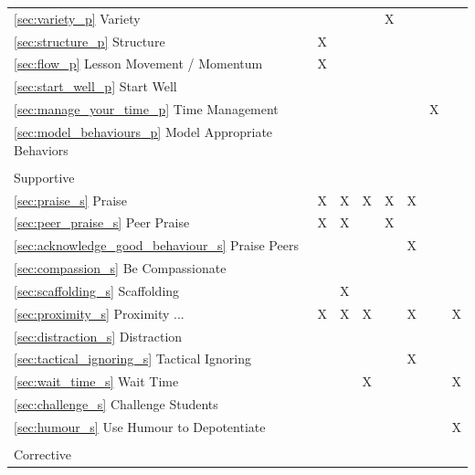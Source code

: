 \documentclass[12pt]{report}
\begin{document}
\begin{longtable}{l|c|c|c|c|c|c|c|}
\hspace{6pt}\ref{sec:variety_p} Variety                        & & & &X& & & \\
\hspace{6pt}\ref{sec:structure_p} Structure                      &X& & & & & & \\
\ref{sec:flow_p} Lesson Movement / Momentum                                       &X& & & & & & \\
\hspace{6pt}\ref{sec:start_well_p} Start Well                     & & & & & & & \\
\ref{sec:manage_your_time_p} Time Management                           & & & & & &X& \\
\ref{sec:model_behaviours_p} Model Appropriate Behaviors                          & & & & & & & \\
\hline
& & & & & & & \\
Supportive & & & & & & & \\ \hline
\ref{sec:praise_s} Praise                                     &X&X&X&X&X& & \\
\hspace{6pt}\ref{sec:peer_praise_s} Peer Praise                    &X&X& &X& & & \\
\hspace{6pt}\ref{sec:acknowledge_good_behaviour_s} Praise Peers     & & & & &X& & \\
\ref{sec:compassion_s} Be Compassionate                                 & & & & & & & \\
\ref{sec:scaffolding_s} Scaffolding                                & &X& & & & & \\
\ref{sec:proximity_s} Proximity ...                                  &X&X&X& &X& &X\\
\ref{sec:distraction_s} Distraction                                & & & & & & & \\
\ref{sec:tactical_ignoring_s} Tactical Ignoring                          & & & & &X& & \\
\ref{sec:wait_time_s} Wait Time                                  & & &X& & & &X\\
\ref{sec:challenge_s} Challenge Students                                  & & & & & & & \\
\ref{sec:humour_s} Use Humour to Depotentiate                                     & & & & & & &X\\
\hline
& & & & & & & \\
Corrective & & & & & & & \\ \hline

\end{longtable}
\end{document}
